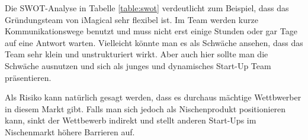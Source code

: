 Die SWOT-Analyse in Tabelle \ref{table:swot} verdeutlicht zum Beispiel, dass das Gründungsteam von iMagical sehr flexibel ist. Im Team werden kurze Kommunikationswege benutzt und muss nicht erst einige Stunden oder gar Tage auf eine Antwort warten. Vielleicht könnte  man es als Schwäche ansehen, dass das Team sehr klein und unstrukturiert wirkt. Aber auch hier sollte man die Schwäche ausnutzen und sich als junges und dynamisches Start-Up Team präsentieren.

Als Risiko kann natürlich gesagt werden, dass es durchaus mächtige Wettbwerber in diesem Markt gibt. Falls man sich jedoch als Nischenprodukt positionieren kann, sinkt der Wettbewerb indirekt und stellt anderen Start-Ups im Nischenmarkt höhere Barrieren auf.